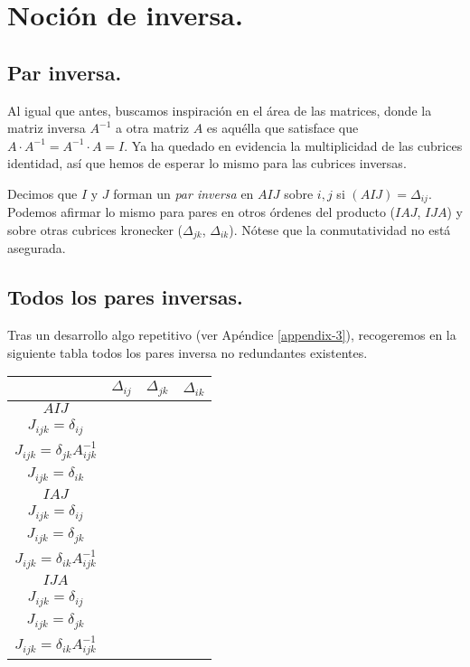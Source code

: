 \section{Noción de inversa.} \label{inverse}

\subsection{Par inversa.} \label{inverse-pair}

Al igual que antes, buscamos inspiración en el área de las matrices, donde la matriz inversa $A^{-1}$ a otra matriz $A$ es aquélla que satisface que ${A\cdot A^{-1} = A^{-1} \cdot A = I}$. Ya ha quedado en evidencia la multiplicidad de las cubrices identidad, así que hemos de esperar lo mismo para las cubrices inversas.

Decimos que $I$ y $J$ forman un \textit{par inversa} en $AIJ$ sobre $i, j$ si $(AIJ) = \Delta_{ij}$. Podemos afirmar lo mismo para pares en otros órdenes del producto ($IAJ$, $IJA$) y sobre otras cubrices kronecker ($\Delta_{jk}$, $\Delta_{ik}$). Nótese que la conmutatividad no está asegurada.

\subsection{Todos los pares inversas.} \label{inverse-all-pairs}

Tras un desarrollo algo repetitivo (ver Apéndice \ref{appendix-3}), recogeremos en la siguiente tabla todos los pares inversa no redundantes existentes.

\vspace{0.5cm}

\begin{tabular}{ |c|c|c|c| } 
	\hline
		  & $\Delta_{ij}$      & $\Delta_{jk}$       & $\Delta_{ik}$ \\
	\hline
	$AIJ$ & \makecell{$I_{ijk} = \delta_{ij} A_{ijk}^{-1}$ \\ $J_{ijk} = \delta_{ij}$}                          & \makecell{$I_{ijk} = \delta_{jk}$ \\ $J_{ijk} = \delta_{jk} A_{ijk}^{-1}$}                          & \makecell{$I_{ijk} = \delta_{ik} A_{kkk}^{-1}$ \\ $J_{ijk} = \delta_{ik}$} \\
	\hline
	$IAJ$ & \makecell{$I_{ijk} = \delta_{ij} A_{ijk}^{-1}$ \\ $J_{ijk} = \delta_{ij}$}                          & \makecell{$I_{ijk} = \delta_{jk} A_{jjj}^{-1}$ \\ $J_{ijk} = \delta_{jk}$} & \makecell{$I_{ijk} = \delta_{ik}$ \\ $J_{ijk} = \delta_{ik} A_{ijk}^{-1}$} \\
	\hline
	$IJA$ & \makecell{$I_{ijk} = \delta_{ij} A_{iii}^{-1}$ \\ $J_{ijk} = \delta_{ij}$} & \makecell{$I_{ijk} = \delta_{jk} A_{ijk}^{-1}$ \\ $J_{ijk} = \delta_{jk}$}                          & \makecell{$I_{ijk} = \delta_{ik}$ \\ $J_{ijk} = \delta_{ik} A_{ijk}^{-1}$} \\
	\hline
\end{tabular}

